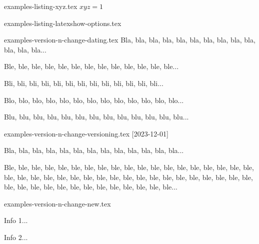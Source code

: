 \begin{filecontents*}[overwrite]{examples-listing-xyz.tex}
$x y z = 1$
\end{filecontents*}


\begin{filecontents*}[overwrite]{examples-listing-latexshow-options.tex}
\end{filecontents*}


\begin{filecontents*}[overwrite]{examples-version-n-change-dating.tex}
Bla, bla, bla, bla, bla, bla, bla, bla, bla, bla, bla, bla, bla...

\medskip %


Ble, ble, ble, ble, ble, ble, ble, ble, ble, ble, ble, ble, ble...

\medskip %


Bli, bli, bli, bli, bli, bli, bli, bli, bli, bli, bli, bli, bli...

Blo, blo, blo, blo, blo, blo, blo, blo, blo, blo, blo, blo, blo...

Blu, blu, blu, blu, blu, blu, blu, blu, blu, blu, blu, blu, blu...
\end{filecontents*}


\begin{filecontents*}[overwrite]{examples-version-n-change-versioning.tex}
[2023-12-01]

Bla, bla, bla, bla, bla, bla, bla, bla, bla, bla, bla, bla, bla...

\bigskip %


Ble, ble, ble, ble, ble, ble, ble, ble, ble, ble, ble, ble, ble,
ble, ble, ble, ble, ble, ble, ble, ble, ble, ble, ble, ble, ble,
ble, ble, ble, ble, ble, ble, ble, ble, ble, ble, ble, ble, ble,
ble, ble, ble, ble, ble, ble, ble, ble, ble, ble, ble, ble...
\end{filecontents*}


\begin{filecontents*}[overwrite]{examples-version-n-change-new.tex}
\begin{tdocnew}
    \item Info 1...
    \item Info 2...
\end{tdocnew}
\end{filecontents*}


